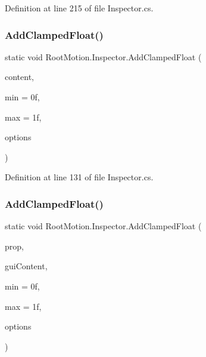 Definition at line 215 of file Inspector.\+cs.

\mbox{\label{class_root_motion_1_1_inspector_a3048b6d957b237840e8e1f2c312db2a1}} 
\subsubsection{\texorpdfstring{Add\+Clamped\+Float()}{AddClampedFloat()}\hspace{0.1cm}{\footnotesize\ttfamily [1/2]}}
{\footnotesize\ttfamily static void Root\+Motion.\+Inspector.\+Add\+Clamped\+Float (\begin{DoxyParamCaption}\item[{\mbox{\hyperlink{struct_root_motion_1_1_serialized_content}{Serialized\+Content}}}]{content,  }\item[{float}]{min = {\ttfamily 0f},  }\item[{float}]{max = {\ttfamily 1f},  }\item[{params G\+U\+I\+Layout\+Option \mbox{[}$\,$\mbox{]}}]{options }\end{DoxyParamCaption})\hspace{0.3cm}{\ttfamily [static]}}



Definition at line 131 of file Inspector.\+cs.

\mbox{\label{class_root_motion_1_1_inspector_ae3b8bee1b12a2d6801eecc66ed015b2a}} 
\subsubsection{\texorpdfstring{Add\+Clamped\+Float()}{AddClampedFloat()}\hspace{0.1cm}{\footnotesize\ttfamily [2/2]}}
{\footnotesize\ttfamily static void Root\+Motion.\+Inspector.\+Add\+Clamped\+Float (\begin{DoxyParamCaption}\item[{Serialized\+Property}]{prop,  }\item[{G\+U\+I\+Content}]{gui\+Content,  }\item[{float}]{min = {\ttfamily 0f},  }\item[{float}]{max = {\ttfamily 1f},  }\item[{params G\+U\+I\+Layout\+Option \mbox{[}$\,$\mbox{]}}]{options }\end{DoxyParamCaption})\hspace{0.3cm}{\ttfamily [static]}}



